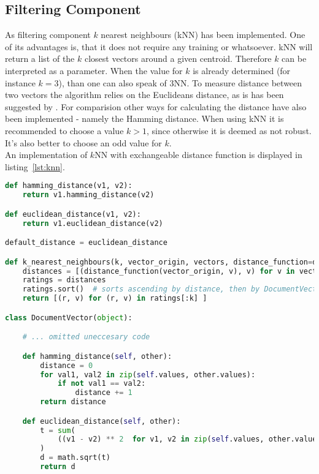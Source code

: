 
\subsection{Filtering Component}
As filtering component $k$ nearest neighbours (kNN) has been implemented.
One of its advantages is, that it does not require any training or whatsoever.\citep[p.~290]{manning:2009}
kNN will return a list of the $k$ closest vectors around a given centroid.
Therefore $k$ can be interpreted as a parameter.
When the value for $k$ is already determined (for instance $k=3$), than one can also speak of 3NN.\citep[p.~297-298]{manning:2009}
To measure distance between two vectors the algorithm relies on the Euclideans distance, as is has been suggested by \citeauthor{manning:2009}.\citep[p.~292]{manning:2009}
For comparision other ways for calculating the distance have also been implemented - namely the Hamming distance.
When using kNN it is recommended to choose a value $k > 1$, since otherwise it is deemed as not robust.
It's also better to choose an odd value for $k$.\\
An implementation of $k$NN with exchangeable distance function is displayed in listing~\ref{lst:knn}.

\begin{lstlisting}[language=Python,caption={kNN and distance methods},label={lst:knn},float=h]
def hamming_distance(v1, v2):
    return v1.hamming_distance(v2)

def euclidean_distance(v1, v2):
    return v1.euclidean_distance(v2)

default_distance = euclidean_distance

def k_nearest_neighbours(k, vector_origin, vectors, distance_function=default_distance):
    distances = [(distance_function(vector_origin, v), v) for v in vectors]
    ratings = distances
    ratings.sort()  # sorts ascending by distance, then by DocumentVector
    return [(r, v) for (r, v) in ratings[:k] ]

class DocumentVector(object):

    # ... omitted uneccesary code

    def hamming_distance(self, other):
        distance = 0
        for val1, val2 in zip(self.values, other.values):
            if not val1 == val2:
                distance += 1
        return distance

    def euclidean_distance(self, other):
        t = sum(
            ((v1 - v2) ** 2  for v1, v2 in zip(self.values, other.values))
        )
        d = math.sqrt(t)
        return d
\end{lstlisting}

